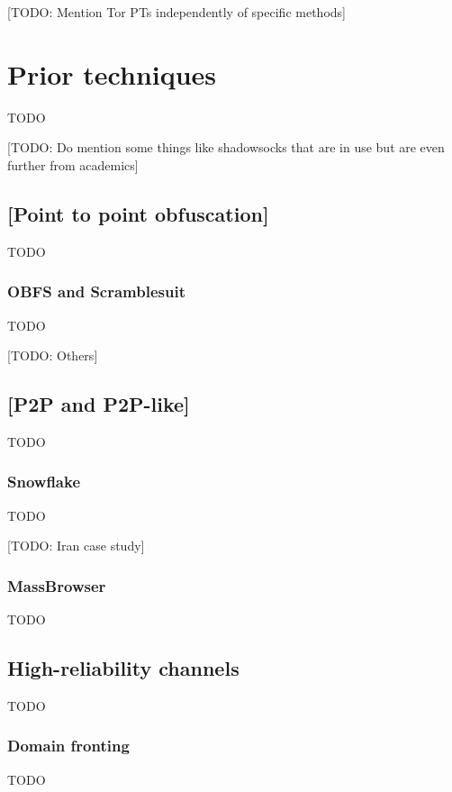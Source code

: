 \documentclass[12pt]{report}
\begin{document}
[TODO: Mention Tor PTs independently of specific methods]

\section{Prior techniques}

TODO

[TODO: Do mention some things like shadowsocks that are in use but are even further from academics]

\subsection{[Point to point obfuscation]}

TODO

\subsubsection{OBFS and Scramblesuit}

TODO

[TODO: Others]

\subsection{[P2P and P2P-like]}

TODO

\subsubsection{Snowflake}

TODO

[TODO: Iran case study]

\subsubsection{MassBrowser}

TODO

\subsection{High-reliability channels}

TODO

\subsubsection{Domain fronting}

TODO
\end{document}
